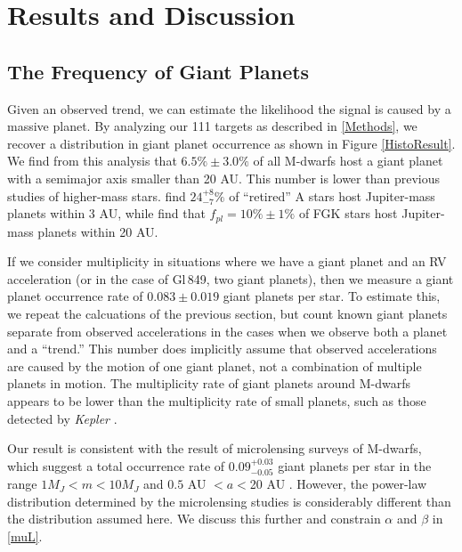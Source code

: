 \section{Results and Discussion}
\label{Results}
\subsection{The Frequency of Giant Planets}
\label{R1}

Given an observed trend, we can estimate the likelihood the signal is caused by a massive planet. By analyzing our 111 targets as described in \textsection\ref{Methods}, we recover a distribution in giant planet occurrence as shown in Figure \ref{HistoResult}. We find from this analysis that $6.5\% \pm 3.0\%$ of all M-dwarfs host a giant planet with a semimajor axis smaller than 20 AU. This number is lower than previous studies of higher-mass stars. \citet{Bowler10} find $24^{+8}_{-7}\%$ of ``retired'' A stars host Jupiter-mass planets within 3 AU, while \citet{Cumming08} find that $f_{pl} = 10\% \pm 1\%$ of FGK stars host Jupiter-mass planets within 20 AU. 

If we consider multiplicity in situations where we have a giant planet and an RV acceleration (or in the case of Gl\,849, two giant planets), then we measure a giant planet occurrence rate of $0.083 \pm 0.019$ giant planets per star. To estimate this, we repeat the calcuations of the previous section, but count known giant planets separate from observed accelerations in the cases when we observe both a planet and a ``trend.'' This number does implicitly assume that observed accelerations are caused by the motion of one giant planet, not a combination of multiple planets in motion. The multiplicity rate of giant planets around M-dwarfs appears to be lower than the multiplicity rate of small planets, such as those detected by \textit{Kepler} \citep{Youdin11}.

Our result is consistent with the result of microlensing surveys of M-dwarfs, which suggest a total occurrence rate of $0.09^{+0.03}_{-0.05}$ giant planets per star in the range $1 M_J < m < 10 M_J$ and $0.5$ AU $< a < $20 AU \citet{Cassan12}. However, the power-law distribution determined by the microlensing studies is considerably different than the \citet{Cumming08} distribution assumed here. We discuss this further and constrain $\alpha$ and $\beta$ in \textsection \ref{muL}.

